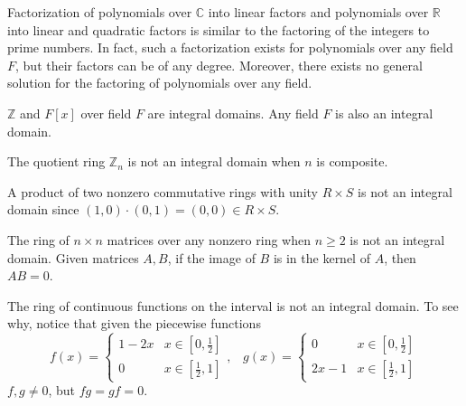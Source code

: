   Factorization of polynomials over $\mathbb{C}$ into linear factors and polynomials over $\mathbb{R}$ into linear and quadratic factors is similar to the factoring of the integers to prime numbers. In fact, such a factorization exists for polynomials over any field $F$, but their factors can be of any degree. Moreover, there exists no general solution for the factoring of polynomials over any field. 

  \begin{theorem}
    
  \end{theorem}

  \begin{example}
    $\mathbb{Z}$ and $F[x]$ over field $F$ are integral domains. Any field $F$ is also an integral domain. 
  \end{example}

  \begin{example}
    The quotient ring $\mathbb{Z}_n$ is not an integral domain when $n$ is composite. 
  \end{example}

  \begin{example}
    A product of two nonzero commutative rings with unity $R \times S$ is not an integral domain since $(1,0) \cdot (0, 1) = (0, 0) \in R \times S$. 
  \end{example}

  \begin{example}
    The ring of $n \times n$ matrices over any nonzero ring when $ n \geq 2$ is not an integral domain. Given matrices $A, B$, if the image of $B$ is in the kernel of $A$, then $A B = 0$.
  \end{example}

  \begin{example}
    The ring of continuous functions on the interval is not an integral domain. To see why, notice that given the piecewise functions 
    \begin{equation}
      f (x) = \begin{cases}
      1 - 2x & x \in [0, \frac{1}{2}] \\
      0 & x \in [\frac{1}{2}, 1] 
      \end{cases}, \; \;\;g (x) = \begin{cases}
      0 & x \in [0, \frac{1}{2}] \\
      2x - 1 & x \in [\frac{1}{2}, 1] 
      \end{cases}
    \end{equation}
    $f, g \neq 0$, but $f g = g f = 0$. 
  \end{example}

